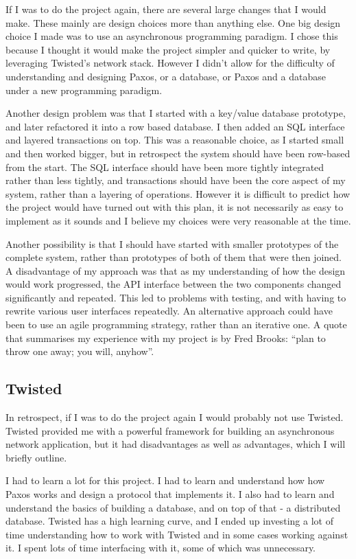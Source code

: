 \documentclass[12pt,twoside,notitlepage]{report}
\begin{document}
If I was to do the project again, there are several large changes that I would make. These mainly
are design choices more than anything else. One big design choice I made was to use an
asynchronous programming paradigm. I chose this because I thought it would make the project
simpler and quicker to write, by leveraging Twisted's network stack. However I didn't allow for
the difficulty of understanding and designing Paxos, or a database, or Paxos and a database under
a new programming paradigm.

Another design problem was that I started with a key/value database prototype, and later
refactored it into a row based database. I then added an SQL interface and layered transactions on
top. This was a reasonable choice, as I started small and then worked bigger, but in retrospect
the system should have been row-based from the start. The SQL interface should have been more
tightly integrated rather than less tightly, and transactions should have been the core aspect of
my system, rather than a layering of operations. However it is difficult to predict how the
project would have turned out with this plan, it is not necessarily as easy to implement as it
sounds and I believe my choices were very reasonable at the time.

Another possibility is that I should have started with smaller prototypes of the complete system,
rather than prototypes of both of them that were then joined. A disadvantage of my approach was
that as my understanding of how the design would work progressed, the API interface between the
two components changed significantly and repeated. This led to problems with testing, and with
having to rewrite various user interfaces repeatedly. An alternative approach could have been to
use an agile programming strategy, rather than an iterative one. A quote that summarises my
experience with my project is by Fred Brooks: ``plan to throw one away; you will, anyhow''.

\subsection*{Twisted}

In retrospect, if I was to do the project again I would probably not use Twisted. Twisted provided
me with a powerful framework for building an asynchronous network application, but it had
disadvantages as well as advantages, which I will briefly outline.

I had to learn a lot for this project. I had to learn and understand how how Paxos works and
design a protocol that implements it. I also had to learn and understand the basics of building a
database, and on top of that - a distributed database. Twisted has a high learning curve, and I
ended up investing a lot of time understanding how to work with Twisted and in some cases working
against it. I spent lots of time interfacing with it, some of which was unnecessary.
\end{document}
